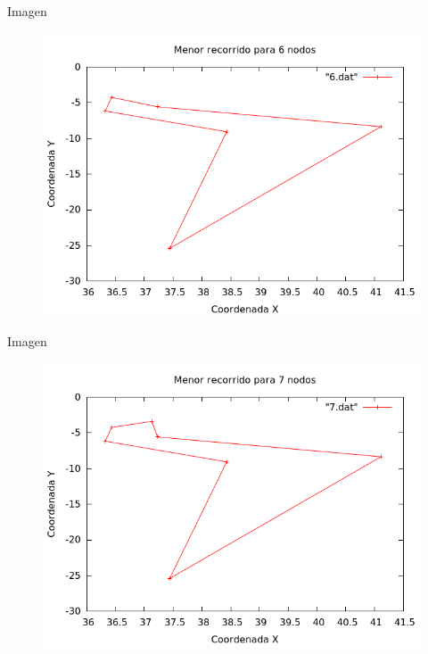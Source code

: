 \begin{frame}
	\begin{exampleblock}{Imagen}
	\begin{figure}[H]
    \centering
    \includegraphics[scale=0.35]{../TSP/Graficas/6.png}
	\end{figure}
	\end{exampleblock}
\end{frame}

\begin{frame}
	\begin{exampleblock}{Imagen}
	\begin{figure}[H]
    \centering
    \includegraphics[scale=0.35]{../TSP/Graficas/7.png}
	\end{figure}
	\end{exampleblock}
\end{frame}

